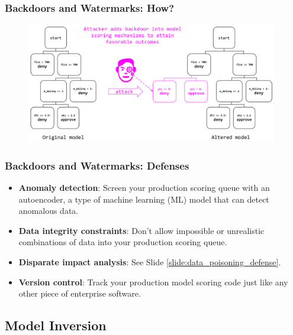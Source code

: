 \documentclass[11pt,
               aspectratio=169,
               hyperref={colorlinks}
               ]{beamer}
\begin{document}
			\begin{frame}
		
				\frametitle{Backdoors and Watermarks: \textbf{How?}}		
			
				\begin{figure}[htb]
					\begin{center}
						\includegraphics[height=150pt]{img/watermark.PNG}
					\end{center}
				\end{figure}	

			\end{frame}
		
			\begin{frame}[label={slide:watermark_defense}]
		
				\frametitle{Backdoors and Watermarks: \textbf{Defenses}}
				\begin{itemize}
				\item \textbf{Anomaly detection}: Screen your production scoring queue with an autoencoder, a type of machine learning (ML) model that can detect anomalous data. 
				\item \textbf{Data integrity constraints}: Don’t allow impossible or unrealistic combinations of data into your production scoring queue.
				\item \textbf{Disparate impact analysis}: See Slide \ref{slide:data_poisoning_defense}.
				\item \textbf{Version control}: Track your production model scoring code just like any other piece of enterprise software.
				\end{itemize}
				
			\end{frame}


		\subsection{Model Inversion}
			
\end{document}
